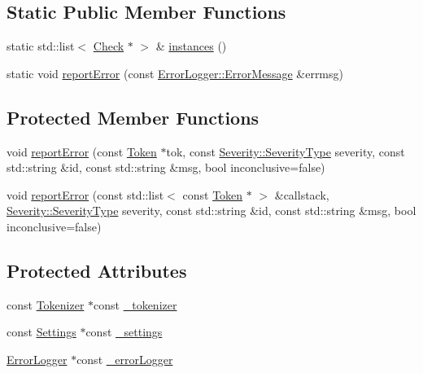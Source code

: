 \subsection*{Static Public Member Functions}
\begin{DoxyCompactItemize}
\item 
static std\-::list$<$ \hyperlink{class_check}{Check} $\ast$ $>$ \& \hyperlink{class_check_aff3c8a2cd1ce8c6b6bd5c8170224ce09}{instances} ()
\item 
static void \hyperlink{class_check_a209cad3fc1f9889b3edc72ae027846af}{report\-Error} (const \hyperlink{class_error_logger_1_1_error_message}{Error\-Logger\-::\-Error\-Message} \&errmsg)
\end{DoxyCompactItemize}
\subsection*{Protected Member Functions}
\begin{DoxyCompactItemize}
\item 
void \hyperlink{class_check_aebef1ee2b6c5f0235caad5d4aaf5f553}{report\-Error} (const \hyperlink{class_token}{Token} $\ast$tok, const \hyperlink{class_severity_ac185938ae084355bbf1790cf1a70caa6}{Severity\-::\-Severity\-Type} severity, const std\-::string \&id, const std\-::string \&msg, bool inconclusive=false)
\item 
void \hyperlink{class_check_ab0b7ba5cec454eb381308e46176ae9c0}{report\-Error} (const std\-::list$<$ const \hyperlink{class_token}{Token} $\ast$ $>$ \&callstack, \hyperlink{class_severity_ac185938ae084355bbf1790cf1a70caa6}{Severity\-::\-Severity\-Type} severity, const std\-::string \&id, const std\-::string \&msg, bool inconclusive=false)
\end{DoxyCompactItemize}
\subsection*{Protected Attributes}
\begin{DoxyCompactItemize}
\item 
const \hyperlink{class_tokenizer}{Tokenizer} $\ast$const \hyperlink{class_check_af177003f600a2f1a22c48b9fd2c4d579}{\-\_\-tokenizer}
\item 
const \hyperlink{class_settings}{Settings} $\ast$const \hyperlink{class_check_a3c1811565f8eff303d84fb797baf9bf9}{\-\_\-settings}
\item 
\hyperlink{class_error_logger}{Error\-Logger} $\ast$const \hyperlink{class_check_a450670ccdb74fcb182d06c82cf3a6359}{\-\_\-error\-Logger}
\end{DoxyCompactItemize}


